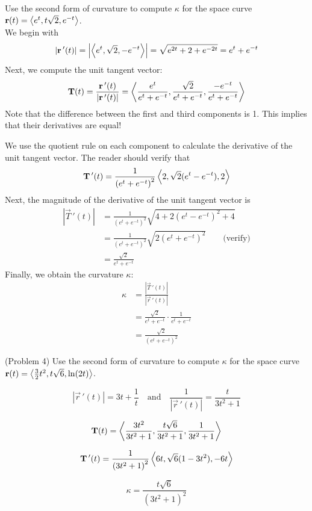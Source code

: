 \documentclass[handout]{ximera}
\begin{document}
\begin{example}[Example 4]
Use the second form of curvature to compute $\kappa$ for the space curve $\mathbf r(t) = \left\langle e^t, t\sqrt 2 , e^{-t}\right\rangle$.\\
We begin with
\[
|\mathbf r\,'(t)| = \left|\left\langle e^t, \sqrt 2 , -e^{-t}\right\rangle\right| = \sqrt{e^{2t} + 2 + e^{-2t}} = e^t + e^{-t}
\]
Next, we compute the unit tangent vector:
\[
\mathbf T(t) = \frac{\mathbf r\,'(t)}{|\mathbf r\,'(t)|} = \left\langle \frac{e^t}{e^t + e^{-t}}, \frac{\sqrt 2}{e^t + e^{-t}} , \frac{-e^{-t}}{e^t + e^{-t}}\right\rangle\\[10pt]
\]
  Note that the difference between the first and third components is 1. This implies that their derivatives are equal!          

We use the quotient rule on each component to calculate the derivative of the unit tangent vector. The reader should verify that
\[
\mathbf T\,'(t) = \frac{1}{\left(e^{t} +e^{-t}\right)^2} \left\langle 2, \sqrt 2 (e^t - e^{-t}), 2\right\rangle 
\]
Next, the magnitude of the derivative of the unit tangent vector is
\begin{align*}
\left|\vec T\,'(t)\right| &= \frac{1}{\left(e^{t} +e^{-t}\right)^2} \sqrt{4 + 2 (e^t - e^{-t})^2 + 4}\\[10pt]
          &= \frac{1}{\left(e^{t} +e^{-t}\right)^2} \sqrt{2(e^{t} +e^{-t})^2} \qquad\text{(verify)}\\[10pt]
            &= \frac{ \sqrt 2}{e^{t} +e^{-t}}
\end{align*}
Finally, we obtain the curvature $\kappa$:
\begin{align*}
\kappa &= \frac{|\vec T\,'(t)|}{|\vec r\,'(t)|}\\[10pt]
       &= \frac{ \sqrt 2}{e^{t} +e^{-t}} \cdot \frac{1}{e^t + e^{-t}}\\[10pt]
      &= \frac{ \sqrt 2}{(e^{t} +e^{-t})^2}
\end{align*}
\end{example}



\begin{problem}(Problem 4)
Use the second form of curvature to compute $\kappa$ for the space curve $\mathbf r(t) = \left\langle \frac32 t^2, t\sqrt 6 , \ln(2t)\right\rangle$.


\begin{hint}
\[
\left|\vec r\,'(t) \right| = 3t + \frac{1}{t}  \quad \text{and} \quad \frac{1}{\left|\vec r\,'(t) \right|} = \frac{t}{3t^2 + 1}
\]
\end{hint}

\begin{hint}
\[
\mathbf T(t) = \left\langle \frac{3t^2}{3t^2 +1},\frac{t\sqrt 6}{3t^2 +1} , \frac{1}{3t^2 +1}\right\rangle
\]
\end{hint}

\begin{hint}
\[
\mathbf T\,'(t) = \frac{1}{\left(3t^2 +1\right)^2} \left\langle 6t, \sqrt 6 (1 - 3t^2), -6t\right\rangle
\]
\end{hint}

\begin{hint}
\[
\kappa = \frac{t\sqrt 6}{\left(3t^2 +1\right)^2}
\]
\end{hint}

\end{problem}
\end{document}
